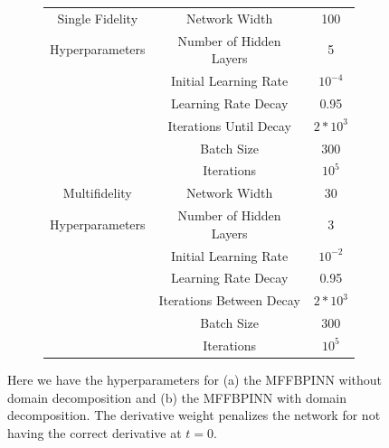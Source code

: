 \documentclass[12pt]{article}
\begin{document}
\begin{figure}[H]
\begin{subfigure}{0.49\textwidth}
\begin{center}
\begin{tabular}{|c|c|c|}
	\hline
	Single Fidelity	& Network Width			& 100 \\
	Hyperparameters & Number of Hidden Layers & 5 \\
					& Initial Learning Rate & $10^{-4}$ \\
					& Learning Rate Decay & 0.95 \\
					& Iterations Until Decay & $2*10^3$ \\
					& Batch Size & 300 \\
					& Iterations & $10^5$ \\
 	\hline
	Multifidelity	& Network Width			& 30 \\
	Hyperparameters & Number of Hidden Layers & 3 \\
					& Initial Learning Rate & $10^{-2}$ \\
					& Learning Rate Decay & 0.95 \\
					& Iterations Between Decay & $2*10^3$ \\
					& Batch Size & 300 \\
					& Iterations & $10^5$ \\
 	\hline
	\end{tabular}
	\end{center}
	\caption{}
     \label{subfig:b}
    \end{subfigure}
\caption{Here we have the hyperparameters for (a) the MFFBPINN without domain decomposition and (b) the MFFBPINN with domain decomposition. The derivative weight penalizes the network for not having the correct derivative at $t=0$.}
\end{figure}
\end{document}
